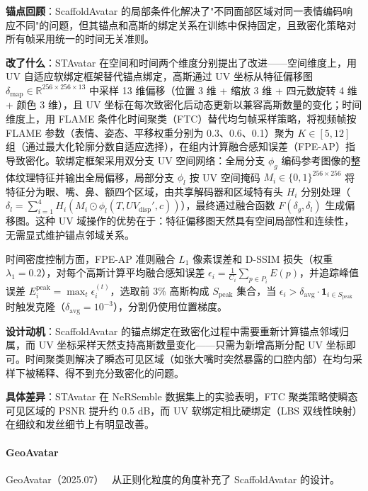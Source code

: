 \textbf{锚点回顾}：ScaffoldAvatar 的局部条件化解决了"不同面部区域对同一表情编码响应不同"的问题，但其锚点和高斯的绑定关系在训练中保持固定，且致密化策略对所有帧采用统一的时间无关准则。

\textbf{改了什么}：STAvatar 在空间和时间两个维度分别提出了改进——空间维度上，用 UV 自适应软绑定框架替代锚点绑定，高斯通过 UV 坐标从特征偏移图 $\delta_{\text{map}} \in \mathbb{R}^{256 \times 256 \times 13}$ 中采样 13 维偏移（位置 3 维 + 缩放 3 维 + 四元数旋转 4 维 + 颜色 3 维），且 UV 坐标在每次致密化后动态更新以兼容高斯数量的变化；时间维度上，用 FLAME 条件化时间聚类（FTC）替代均匀帧采样策略，将视频帧按 FLAME 参数（表情、姿态、平移权重分别为 0.3、0.6、0.1）聚为 $K \in [5, 12]$ 组（通过最大化轮廓分数自适应选择），在组内计算融合感知误差（FPE-AP）指导致密化。软绑定框架采用双分支 UV 空间网络：全局分支 $\phi_g$ 编码参考图像的整体纹理特征并输出全局偏移，局部分支 $\phi_l$ 按 UV 空间掩码 $M_i \in \{0,1\}^{256 \times 256}$ 将特征分为眼、嘴、鼻、额四个区域，由共享解码器和区域特有头 $H_i$ 分别处理（$\delta_l = \sum_{i=1}^4 H_i(M_i \odot \phi_l(T, UV_{\text{disp}}', c))$），最终通过融合函数 $F(\delta_g, \delta_l)$ 生成偏移图。这种 UV 域操作的优势在于：特征偏移图天然具有空间局部性和连续性，无需显式维护锚点邻域关系。

时间密度控制方面，FPE-AP 准则融合 $L_1$ 像素误差和 D-SSIM 损失（权重 $\lambda_1=0.2$），对每个高斯计算平均融合感知误差 $\epsilon_i = \frac{1}{C_i} \sum_{p \in P_i} E(p)$，并追踪峰值误差 $E_i^{\text{peak}} = \max_t \epsilon_i^{(t)}$，选取前 3\% 高斯构成 $S_{\text{peak}}$ 集合，当 $\epsilon_i > \delta_{\text{avg}} \cdot \mathbf{1}_{i \in S_{\text{peak}}}$ 时触发克隆（$\delta_{\text{avg}}=10^{-3}$），分割仍使用位置梯度。

\textbf{设计动机}：ScaffoldAvatar 的锚点绑定在致密化过程中需要重新计算锚点邻域归属，而 UV 坐标采样天然支持高斯数量变化——只需为新增高斯分配 UV 坐标即可。时间聚类则解决了瞬态可见区域（如张大嘴时突然暴露的口腔内部）在均匀采样下被稀释、得不到充分致密化的问题。

\textbf{具体差异}：STAvatar 在 NeRSemble 数据集上的实验表明，FTC 聚类策略使瞬态可见区域的 PSNR 提升约 0.5 dB，而 UV 软绑定相比硬绑定（LBS 双线性映射）在细纹和发丝细节上有明显改善。

\paragraph{GeoAvatar}

GeoAvatar（2025.07）~\cite{2507_18155} 从正则化粒度的角度补充了 ScaffoldAvatar 的设计。

